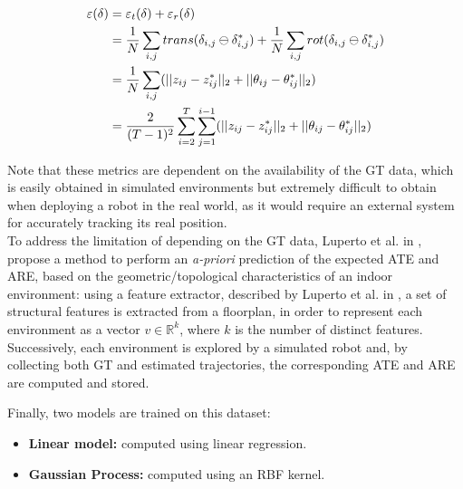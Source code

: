 \begin{equation*}
    \begin{split}
        \centering
            \varepsilon(\delta) & = \varepsilon_t(\delta) + \varepsilon_r(\delta)\\
            & = \frac{1}{N}\sum_{i, j}trans(\delta_{i,j}\ominus\delta_{i,j}^*)+\frac{1}{N}\sum_{i, j}rot(\delta_{i,j}\ominus\delta_{i,j}^*)\\
            & = \frac{1}{N}\sum_{i, j}(||z_{ij} - z_{ij}^*||_2 + ||\theta_{ij} - \theta_{ij}^*||_2) \\
            & = \frac{2}{(T-1)^2}\sum_{i=2}^T\sum_{j=1}^{i-1}(||z_{ij} - z_{ij}^*||_2 + ||\theta_{ij} - \theta_{ij}^*||_2)\\
    \end{split}
\end{equation*}

\noindent
Note that these metrics are dependent on the availability of the GT data, which is easily obtained in simulated environments but extremely difficult to obtain when deploying a robot in the real world, as it would require an external system for accurately tracking its real position.\\

\noindent
To address the limitation of depending on the GT data, Luperto et al. in \cite{luperto2021predicting}, propose a method to perform an \textit{a-priori} prediction of the expected ATE and ARE, based on the geometric/topological characteristics of an indoor environment: using a feature extractor, described by Luperto et al. in \cite{luperto2019extracting}, a set of structural features is extracted from a floorplan, in order to represent each environment as a vector $v\in\mathbb{R}^k$, where $k$ is the number of distinct features.
Successively, each environment is explored by a simulated robot and, by collecting both GT and estimated trajectories, the corresponding ATE and ARE are computed and stored.

\noindent
Finally, two models are trained on this dataset:
\begin{itemize}
    \item \textbf{Linear model:} computed using linear regression.
    \item \textbf{Gaussian Process:} computed using an RBF kernel.
\end{itemize}

